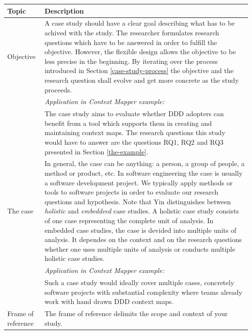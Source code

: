 \documentclass[runningheads]{llncs}
\begin{document}
\begin{tabularx}{\textwidth}{ p{3.0cm} X }
\caption{Elements to be considered when planning a case study \cite{robson2002real}}\label{tab:case-study-planning-issues} \\
	\hline
	\RaggedRight \textbf{Topic} & \RaggedRight \textbf{Description} \\
	\hline
	\endhead
	\RaggedRight Objective & \RaggedRight A case study should have a clear goal describing what has to be achived with the study. The researcher formulates research questions which have to be answered in order to fulfill the objective. However, the flexible design allows the objective to be less precise in the beginning. By iterating over the process introduced in Section \ref{case-study-process} the objective and the research question shall evolve and get more concrete as the study proceeds. \\
	\RaggedRight & \RaggedRight \textit{Application in Context Mapper example:} \\
	\RaggedRight & \RaggedRight The case study aims to evaluate whether DDD adopters can benefit from a tool which supports them in creating and maintaining context maps. The research questions this study would have to answer are the questions RQ1, RQ2 and RQ3 presented in Section \ref{the-example}. \\
	\hline
	\RaggedRight The case & \RaggedRight In general, the case can be anything: a person, a group of people, a method or product, etc. In software engineering the case is usually a software development project. We typically apply methods or tools to software projects in order to evaluate our research questions and hypothesis. Note that Yin \cite{yin2009case} distinguishes between \textit{holistic} and \textit{embeddeed} case studies. A holistic case study consists of one case representing the complete unit of analysis. In embedded case studies, the case is devided into multiple units of analysis. It dependes on the context and on the research questions whether one uses multiple units of analysis or conducts multiple holistic case studies. \\
	\RaggedRight & \RaggedRight \textit{Application in Context Mapper example:} \\
	\RaggedRight & \RaggedRight Such a case study would ideally cover multiple cases, concretely software projects with substantial complexity where teams already work with hand drawn DDD context maps. \\
	\hline
	\RaggedRight Frame of reference & \RaggedRight The frame of reference delimits the scope and context of your study. \\

\end{tabularx}
\end{document}
